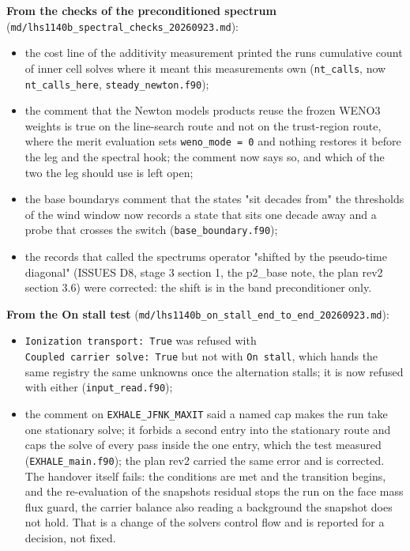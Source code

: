 \documentclass[english,a4paper]{my_memo}
\providecommand{\tightlist}{\setlength{\itemsep}{0pt}\setlength{\parskip}{0pt}}
\begin{document}
\textbf{From the checks of the preconditioned spectrum}
(\texttt{md/lhs1140b\_spectral\_checks\_20260923.md}):

\begin{itemize}
\tightlist
\item
  the cost line of the additivity measurement printed the run\textquotesingle s cumulative
  count of inner cell solves where it meant this measurement\textquotesingle s own
  (\texttt{nt\_calls}, now \texttt{nt\_calls\_here}, \texttt{steady\_newton.f90});
\item
  the comment that the Newton model\textquotesingle s products reuse the frozen WENO3
  weights is true on the line-search route and not on the trust-region route,
  where the merit evaluation sets \texttt{weno\_mode\ =\ 0} and nothing restores it
  before the leg and the spectral hook; the comment now says so, and which of
  the two the leg should use is left open;
\item
  the base boundary\textquotesingle s comment that the states "sit decades from" the
  thresholds of the wind window now records a state that sits one decade away
  and a probe that crosses the switch (\texttt{base\_boundary.f90});
\item
  the records that called the spectrum\textquotesingle s operator "shifted by the pseudo-time
  diagonal" (ISSUES D8, stage 3 section 1, the p2\_base note, the plan rev2
  section 3.6) were corrected: the shift is in the band preconditioner only.
\end{itemize}

\textbf{From the On stall test} (\texttt{md/lhs1140b\_on\_stall\_end\_to\_end\_20260923.md}):

\begin{itemize}
\tightlist
\item
  \texttt{Ionization\ transport:\ True} was refused with \texttt{Coupled\ carrier\ solve:\ True}
  but not with \texttt{On\ stall}, which hands the same registry the same unknowns
  once the alternation stalls; it is now refused with either
  (\texttt{input\_read.f90});
\item
  the comment on \texttt{EXHALE\_JFNK\_MAXIT} said a named cap makes the run take one
  stationary solve; it forbids a second entry into the stationary route and
  caps the solve of every pass inside the one entry, which the test measured
  (\texttt{EXHALE\_main.f90}); the plan rev2 carried the same error and is corrected.
  The handover itself fails: the conditions are met and the transition begins,
  and the re-evaluation of the snapshot\textquotesingle s residual stops the run on the face
  mass flux guard, the carrier balance also reading a background the snapshot
  does not hold. That is a change of the solver\textquotesingle s control flow and is reported
  for a decision, not fixed.
\end{itemize}
\end{document}
